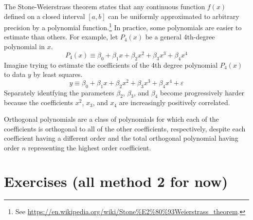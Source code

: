\documentclass[letterpaper,12pt]{article}
\theoremstyle{definition}
\newcommand\ve{\varepsilon}
\begin{document}
    The Stone-Weierstrass theorem states that any continuous function $f(x)$ defined on a closed interval $[a,b]$ can be uniformly approximated to arbitrary precision by a polynomial function.\footnote{See \href{https://en.wikipedia.org/wiki/Stone\%E2\%80\%93Weierstrass_theorem}{https://en.wikipedia.org/wiki/Stone\%E2\%80\%93Weierstrass\_theorem}.} In practice, some polynomials are easier to estimate than others. For example, let $P_4(x)$ be a general 4th-degree polynomial in $x$.
    \begin{equation}\label{EqPoly4x}
      P_4(x)\equiv \beta_0 + \beta_1 x + \beta_2 x^2 + \beta_3 x^3  + \beta_4 x^4
    \end{equation}
    Imagine trying to estimate the coefficients of the 4th degree polynomial $P_4(x)$ to data $y$ by least squares.
    \begin{equation}\label{EqPoly4x_fit}
      y\equiv \beta_0 + \beta_1 x + \beta_2 x^2 + \beta_3 x^3  + \beta_4 x^4 + \ve
    \end{equation}
    Separately identfying the parameters $\beta_2$, $\beta_3$, and $\beta_4$ become progressively harder because the coefficients $x^2$, $x_3$, and $x_4$ are increasingly positively correlated.

    Orthogonal polynomials are a class of polynomials for which each of the coefficients is orthogonal to all of the other coefficients, respectively, despite each coefficient having a different order and the total orthogonal polynomial having order $n$ representing the highest order coefficient.


\section{Exercises (all method 2 for now)}\label{SecExercises}
\end{document}

